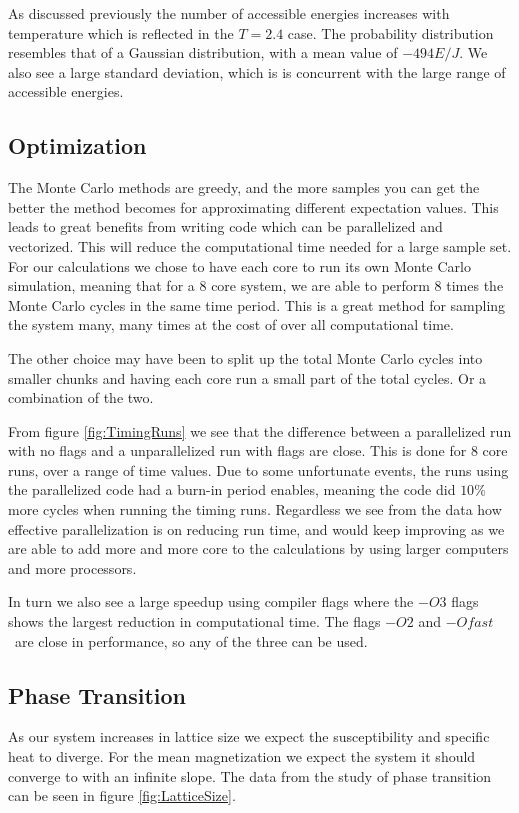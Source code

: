 \documentclass[%
reprint,
nofootinbib,
amsmath,amssymb,
aps,
]{revtex4-1}
\begin{document}
As discussed previously the number of accessible energies increases with temperature which is reflected in the $T=2.4$ case. The probability distribution resembles that of a Gaussian distribution, with a mean value of $-494E/J$. We also see a large standard deviation, which is is concurrent with the large range of accessible energies. 
\subsection{Optimization} %
The Monte Carlo methods are greedy, and the more samples you can get the better the method becomes for approximating different expectation values. This leads to great benefits from writing code which can be parallelized and vectorized. This will reduce the computational time needed for a large sample set. For our calculations we chose to have each core to run its own Monte Carlo simulation, meaning that for a 8 core system, we are able to perform 8 times the Monte Carlo cycles in the same time period. This is a great method for sampling the system many, many times at the cost of over all computational time. 

The other choice may have been to split up the total Monte Carlo cycles into smaller chunks and having each core run a small part of the total cycles. Or a combination of the two. 

From figure \ref{fig:TimingRuns} we see that the difference between a parallelized run with no flags and a unparallelized run with flags are close. This is done for 8 core runs, over a range of time values. Due to some unfortunate events, the runs using the parallelized code had a burn-in period enables, meaning the code did $10\%$ more cycles when running the timing runs. Regardless we see from the data how effective parallelization is on reducing run time, and would keep improving as we are able to add more and more core to the calculations by using larger computers and more processors. 

In turn we also see a large speedup using compiler flags where the $-O3$ flags shows the largest reduction in computational time. The flags $-O2$ and $-Ofast$ are close in performance, so any of the three can be used. 

\subsection{Phase Transition} %
As our system increases in lattice size we expect the susceptibility and specific heat to diverge. For the mean magnetization we expect the system it should converge to with an infinite slope. The data from the study of phase transition can be seen in figure \ref{fig:LatticeSize}.
\end{document}
